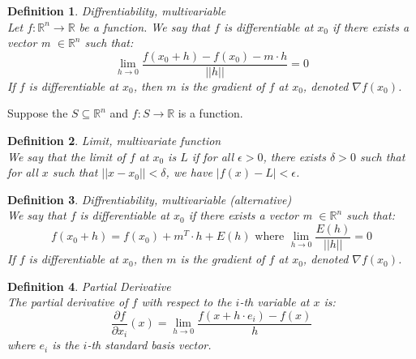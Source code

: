 \documentclass[11pt]{book} %
\newtheorem{definition}{Definition}[section]
\begin{document}
\bigbreak

\begin{definition}{Diffrentiability, multivariable} \\
Let $f: \mathbb{R}^n \rightarrow \mathbb{R}$ be a function. We say that $f$ is differentiable at $x_0$ if there exists a vector m $\in \mathbb{R}^n$ such that:
\begin{equation}
    \lim_{h \rightarrow 0} \frac{f(x_0 + h) - f(x_0) - m \cdot h}{||h||} = 0
\end{equation}
If $f$ is differentiable at $x_0$, then $m$ is the gradient of $f$ at $x_0$, denoted $\nabla f(x_0)$.
\end{definition}

\bigbreak

Suppose the $S \subseteq \mathbb{R}^n$ and $f: S \rightarrow \mathbb{R}$ is a function. 

\bigbreak

\begin{definition}{Limit, multivariate function} \\
We say that the limit of $f$ at $x_0$ is $L$ if for all $\epsilon > 0$, there exists $\delta > 0$ such that 
for all $x$ such that $||x - x_0|| < \delta$, we have $|f(x) - L| < \epsilon$.
\end{definition}

\begin{definition}{Diffrentiability, multivariable (alternative)} \\
We say that $f$ is differentiable at $x_0$ if there exists a vector m $\in \mathbb{R}^n$ such that:
\begin{equation}
    f(x_0 + h) = f(x_0) + m^T \cdot h + E(h) \text{ where } \lim_{h \rightarrow 0} \frac{E(h)}{||h||} = 0
\end{equation}
If $f$ is differentiable at $x_0$, then $m$ is the gradient of $f$ at $x_0$, denoted $\nabla f(x_0)$.
\end{definition}

\bigbreak

\begin{definition}{Partial Derivative} \\
The partial derivative of $f$ with respect to the $i$-th variable at $x$ is:
\begin{equation}
    \frac{\partial f}{\partial x_i}(x) = \lim_{h \rightarrow 0} \frac{f(x + h \cdot e_i) - f(x)}{h}
\end{equation}
where $e_i$ is the $i$-th standard basis vector.
\end{definition}
\end{document}

